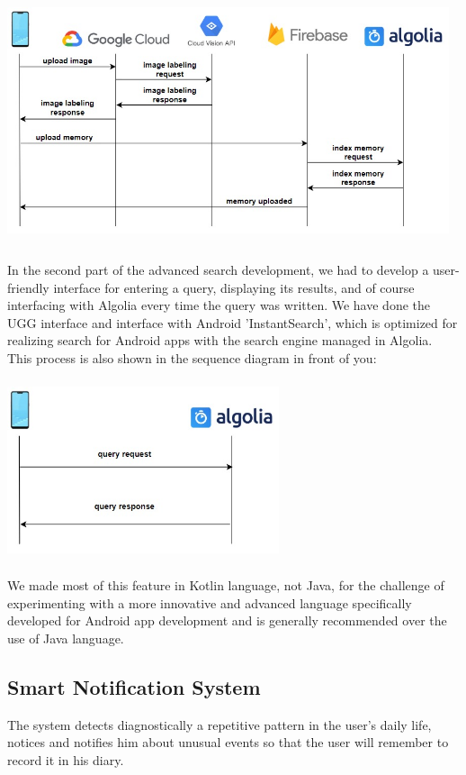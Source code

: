 \documentclass{article}
\begin{document}
\\\\
\includegraphics[width=13cm, height=7cm]{uploadMemoryDiagram}
\\\\
In the second part of the advanced search development, we had to develop a user-friendly interface for entering a query, displaying its results, and of course interfacing with Algolia every time the query was written. We have done the UGG interface and interface with Android 'InstantSearch', which is optimized for realizing search for Android apps with the search engine managed in Algolia. This process is also shown in the sequence diagram in front of you:
\\\\
\includegraphics[width=8cm, height=5cm]{searchQueryDiagram}
\\\\
We made most of this feature in Kotlin language, not Java, for the challenge of experimenting with a more innovative and advanced language specifically developed for Android app development and is generally recommended over the use of Java language.
\subsection{Smart Notification System}
The system detects diagnostically a repetitive pattern in the user's daily life, notices and notifies him about unusual events so that the user will remember to record it in his diary.
\end{document}
